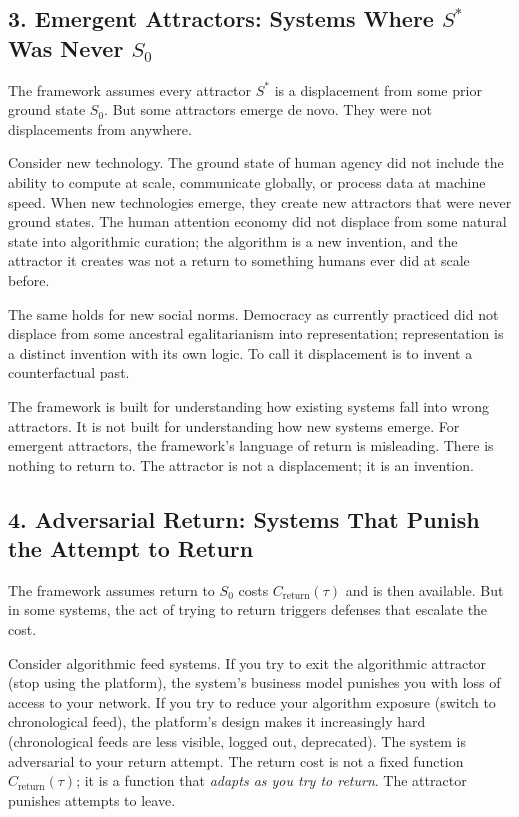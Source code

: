 \documentclass[12pt]{article}
\begin{document}
\subsection{3. Emergent Attractors: Systems Where $S^*$ Was Never $S_0$}

The framework assumes every attractor $S^*$ is a displacement from some prior ground state $S_0$. But some attractors emerge de novo. They were not displacements from anywhere.

Consider new technology. The ground state of human agency did not include the ability to compute at scale, communicate globally, or process data at machine speed. When new technologies emerge, they create new attractors that were never ground states. The human attention economy did not displace from some natural state into algorithmic curation; the algorithm is a new invention, and the attractor it creates was not a return to something humans ever did at scale before.

The same holds for new social norms. Democracy as currently practiced did not displace from some ancestral egalitarianism into representation; representation is a distinct invention with its own logic. To call it displacement is to invent a counterfactual past.

The framework is built for understanding how existing systems fall into wrong attractors. It is not built for understanding how new systems emerge. For emergent attractors, the framework's language of return is misleading. There is nothing to return to. The attractor is not a displacement; it is an invention.

\subsection{4. Adversarial Return: Systems That Punish the Attempt to Return}

The framework assumes return to $S_0$ costs $C_{\text{return}}(\tau)$ and is then available. But in some systems, the act of trying to return triggers defenses that escalate the cost.

Consider algorithmic feed systems. If you try to exit the algorithmic attractor (stop using the platform), the system's business model punishes you with loss of access to your network. If you try to reduce your algorithm exposure (switch to chronological feed), the platform's design makes it increasingly hard (chronological feeds are less visible, logged out, deprecated). The system is adversarial to your return attempt. The return cost is not a fixed function $C_{\text{return}}(\tau)$; it is a function that \textit{adapts as you try to return}. The attractor punishes attempts to leave.
\end{document}
